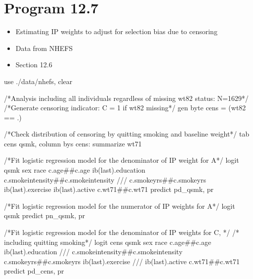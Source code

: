 \documentclass[
  10pt,
  a4paper,
]{book}
\newenvironment{Shaded}{\begin{snugshade}}{\end{snugshade}}
\newcommand{\CommentTok}[1]{\textcolor[rgb]{0.37,0.37,0.37}{#1}}
\newcommand{\FunctionTok}[1]{\textcolor[rgb]{0.28,0.35,0.67}{#1}}
\newcommand{\KeywordTok}[1]{\textcolor[rgb]{0.00,0.46,0.62}{#1}}
\newcommand{\NormalTok}[1]{\textcolor[rgb]{0.00,0.46,0.62}{#1}}
\providecommand{\tightlist}{%
  \setlength{\itemsep}{0pt}\setlength{\parskip}{0pt}}
\begin{document}
\hypertarget{program-12.7-1}{%
\section{Program 12.7}\label{program-12.7-1}}

\begin{itemize}
\tightlist
\item
  Estimating IP weights to adjust for selection bias due to censoring
\item
  Data from NHEFS
\item
  Section 12.6
\end{itemize}

\begin{Shaded}
\begin{Highlighting}[]
\KeywordTok{use}\NormalTok{ ./}\KeywordTok{data}\NormalTok{/nhefs, }\KeywordTok{clear}

\CommentTok{/*Analysis including all individuals regardless of missing wt82 status: N=1629*/}
\CommentTok{/*Generate censoring indicator: C = 1 if wt82 missing*/}
\KeywordTok{gen} \KeywordTok{byte}\NormalTok{ cens = (wt82 == .)}

\CommentTok{/*Check distribution of censoring by quitting smoking and baseline weight*/}
\KeywordTok{tab}\NormalTok{ cens qsmk, column}
\KeywordTok{bys}\NormalTok{ cens: }\KeywordTok{summarize}\NormalTok{ wt71}

\CommentTok{/*Fit logistic regression model for the  denominator of IP weight for A*/}
\KeywordTok{logit}\NormalTok{ qsmk sex race c.age\#\#c.age ib(}\FunctionTok{last}\NormalTok{).education c.smokeintensity\#\#c.smokeintensity }\CommentTok{///}
\NormalTok{c.smokeyrs\#\#c.smokeyrs ib(}\FunctionTok{last}\NormalTok{).exercise ib(}\FunctionTok{last}\NormalTok{).active c.wt71\#\#c.wt71 }
\KeywordTok{predict}\NormalTok{ pd\_qsmk, pr}

\CommentTok{/*Fit logistic regression model for the numerator of IP weights for A*/}
\KeywordTok{logit}\NormalTok{ qsmk}
\KeywordTok{predict}\NormalTok{ pn\_qsmk, pr}

\CommentTok{/*Fit logistic regression model for the denominator of IP weights for C, */}
\CommentTok{/* including quitting smoking*/}
\KeywordTok{logit}\NormalTok{ cens qsmk sex race c.age\#\#c.age ib(}\FunctionTok{last}\NormalTok{).education }\CommentTok{///}
\NormalTok{c.smokeintensity\#\#c.smokeintensity c.smokeyrs\#\#c.smokeyrs ib(}\FunctionTok{last}\NormalTok{).exercise }\CommentTok{///}
\NormalTok{ib(}\FunctionTok{last}\NormalTok{).active c.wt71\#\#c.wt71 }
\KeywordTok{predict}\NormalTok{ pd\_cens, pr}


\end{Highlighting}
\end{Shaded}
\end{document}
